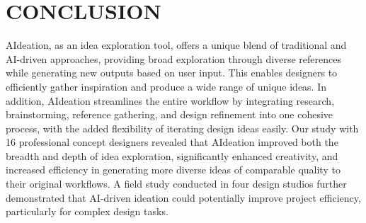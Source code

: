 \section{CONCLUSION}
AIdeation, as an idea exploration tool, offers a unique blend of traditional and AI-driven approaches, providing broad exploration through diverse references while generating new outputs based on user input. This enables designers to efficiently gather inspiration and produce a wide range of unique ideas. In addition, AIdeation streamlines the entire workflow by integrating research, brainstorming, reference gathering, and design refinement into one cohesive process, with the added flexibility of iterating design ideas easily. Our study with 16 professional concept designers revealed that AIdeation improved both the breadth and depth of idea exploration, significantly enhanced creativity, and increased efficiency in generating more diverse ideas of comparable quality to their original workflows. A field study conducted in four design studios further demonstrated that AI-driven ideation could potentially improve project efficiency, particularly for complex design tasks.


%
